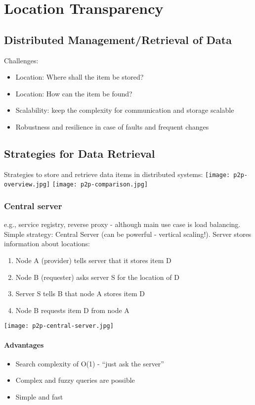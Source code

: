 \section{Location Transparency}
\subsection{Distributed Management/Retrieval of Data}
Challenges: 
\begin{itemize}
  \item Location: Where shall the item be stored?
  \item Location: How can the item be found?
  \item Scalability: keep the complexity for communication and storage scalable
  \item Robustness and resilience in case of faults and frequent changes
\end{itemize}

\subsection{Strategies for Data Retrieval}
Strategies to store and retrieve data items in distributed systems:
\texttt{[image: p2p-overview.jpg]}
\texttt{[image: p2p-comparison.jpg]}

\subsubsection{Central server}
e.g., service registry, reverse proxy - although main use case is load balancing.
Simple strategy: Central Server (can be powerful - vertical scaling!).
Server stores information about locations:
\begin{enumerate}
  \item Node A (provider) tells server that it stores item D
  \item Node B (requester) asks server S for the location of D
  \item Server S tells B that node A stores item D
  \item Node B requests item D from node A
\end{enumerate}
\texttt{[image: p2p-central-server.jpg]}
\paragraph{Advantages}
\begin{itemize}
  \item Search complexity of O(1) - ``just ask the server''
  \item Complex and fuzzy queries are possible
  \item Simple and fast
\end{itemize}

